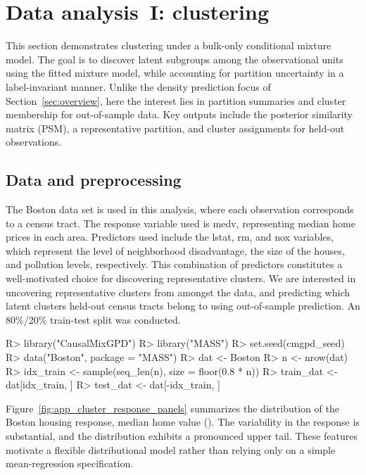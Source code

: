 \documentclass[article]{jss}\usepackage[]{graphicx}\usepackage[]{xcolor}
\renewenvironment{Schunk}{\vspace{0pt}}{\vspace{-0.1\baselineskip}}
\begin{document}
\section{Data analysis~I: clustering}
\label{sec:app-clustering}

This section demonstrates clustering under a bulk-only conditional mixture model. The goal is to discover latent subgroups among the observational units using the fitted mixture model, while accounting for partition uncertainty in a label-invariant manner. Unlike the density prediction focus of Section~\ref{sec:overview}, here the interest lies in partition summaries and cluster membership for out-of-sample data. Key outputs include the posterior similarity matrix (PSM), a representative partition, and cluster assignments for held-out observations.

\subsection{Data and preprocessing}

The Boston data set is used in this analysis, where each observation corresponds to a census tract. The response variable used is medv, representing median home prices in each area. Predictors used include the lstat, rm, and nox variables, which represent the level of neighborhood disadvantage, the size of the houses, and pollution levels, respectively. This combination of predictors constitutes a well-motivated choice for discovering representative clusters. We are interested in uncovering representative clusters from amongst the data, and predicting which latent clusters held-out census tracts belong to using out-of-sample prediction. An 80\%/20\% train-test split was conducted.

\begin{Schunk}
\begin{Sinput}
R> library("CausalMixGPD")
R> library("MASS")
R> set.seed(cmgpd_seed)
R> data("Boston", package = "MASS")
R> dat <- Boston
R> n <- nrow(dat)
R> idx_train <- sample(seq_len(n), size = floor(0.8 * n))
R> train_dat <- dat[idx_train, ]
R> test_dat <- dat[-idx_train, ]
\end{Sinput}
\end{Schunk}
Figure~\ref{fig:app_cluster_response_panels} summarizes the distribution of the Boston housing response, median home value (). The variability in the response is substantial, and the distribution exhibits a pronounced upper tail. These features motivate a flexible distributional model rather than relying only on a simple mean-regression specification.
\end{document}
